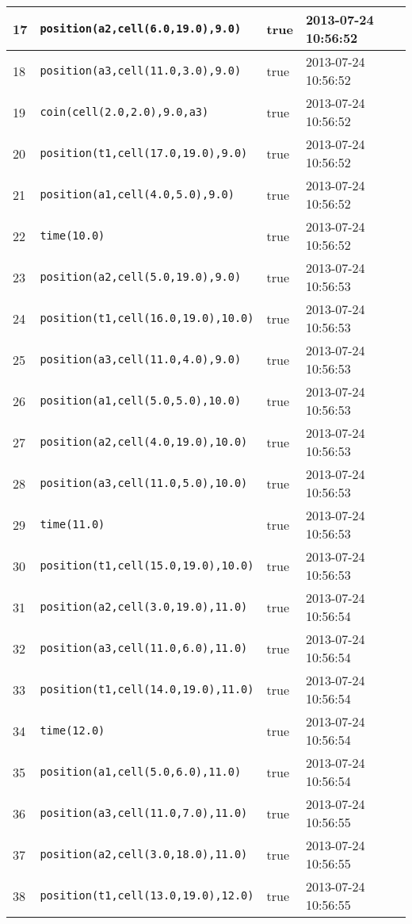 \documentclass[11pt]{article}\usepackage[utf8]{inputenc}\usepackage{geometry}
\begin{document}
\begin{table}[ht]
\begin{tabular}{l l l l}
17&\texttt{position(a2,cell(6.0,19.0),9.0)}&true&2013-07-24 10:56:52\\ [1ex] \hline
18&\texttt{position(a3,cell(11.0,3.0),9.0)}&true&2013-07-24 10:56:52\\ [1ex] \hline
19&\texttt{coin(cell(2.0,2.0),9.0,a3)}&true&2013-07-24 10:56:52\\ [1ex] \hline
20&\texttt{position(t1,cell(17.0,19.0),9.0)}&true&2013-07-24 10:56:52\\ [1ex] \hline
21&\texttt{position(a1,cell(4.0,5.0),9.0)}&true&2013-07-24 10:56:52\\ [1ex] \hline
22&\texttt{time(10.0)}&true&2013-07-24 10:56:52\\ [1ex] \hline
23&\texttt{position(a2,cell(5.0,19.0),9.0)}&true&2013-07-24 10:56:53\\ [1ex] \hline
24&\texttt{position(t1,cell(16.0,19.0),10.0)}&true&2013-07-24 10:56:53\\ [1ex] \hline
25&\texttt{position(a3,cell(11.0,4.0),9.0)}&true&2013-07-24 10:56:53\\ [1ex] \hline
26&\texttt{position(a1,cell(5.0,5.0),10.0)}&true&2013-07-24 10:56:53\\ [1ex] \hline
27&\texttt{position(a2,cell(4.0,19.0),10.0)}&true&2013-07-24 10:56:53\\ [1ex] \hline
28&\texttt{position(a3,cell(11.0,5.0),10.0)}&true&2013-07-24 10:56:53\\ [1ex] \hline
29&\texttt{time(11.0)}&true&2013-07-24 10:56:53\\ [1ex] \hline
30&\texttt{position(t1,cell(15.0,19.0),10.0)}&true&2013-07-24 10:56:53\\ [1ex] \hline
31&\texttt{position(a2,cell(3.0,19.0),11.0)}&true&2013-07-24 10:56:54\\ [1ex] \hline
32&\texttt{position(a3,cell(11.0,6.0),11.0)}&true&2013-07-24 10:56:54\\ [1ex] \hline
33&\texttt{position(t1,cell(14.0,19.0),11.0)}&true&2013-07-24 10:56:54\\ [1ex] \hline
34&\texttt{time(12.0)}&true&2013-07-24 10:56:54\\ [1ex] \hline
35&\texttt{position(a1,cell(5.0,6.0),11.0)}&true&2013-07-24 10:56:54\\ [1ex] \hline
36&\texttt{position(a3,cell(11.0,7.0),11.0)}&true&2013-07-24 10:56:55\\ [1ex] \hline
37&\texttt{position(a2,cell(3.0,18.0),11.0)}&true&2013-07-24 10:56:55\\ [1ex] \hline
38&\texttt{position(t1,cell(13.0,19.0),12.0)}&true&2013-07-24 10:56:55\\ [1ex] \hline

\end{tabular}
\end{table}
\end{document}

